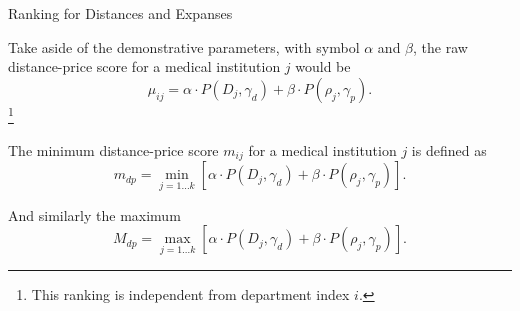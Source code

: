 \documentclass[8pt, hyperref={colorlinks=true}]{beamer}
\begin{document}
\begin{frame}{Ranking for Distances and Expanses}
\begin{definition}
Take aside of the demonstrative parameters, with symbol $\alpha$ and $\beta$, the raw distance-price score for a medical institution $j$ would be
\[
\mu_{ij}=\alpha \cdot P\left(D_j, \gamma_d\right) + \beta \cdot P\left(\rho_j, \gamma_p\right).
\]\footnote{This ranking is independent from department index $i$.}

The minimum distance-price score $m_{ij}$ for a medical institution $j$ is defined as
\[
m_{dp}=\min_{j = 1\dots k} \left[\alpha \cdot P\left(D_j, \gamma_d\right) + \beta \cdot P\left(\rho_j, \gamma_p\right)\right].
\]

And similarly the maximum
\[
M_{dp}=\max_{j = 1\dots k} \left[\alpha \cdot P\left(D_j, \gamma_d\right) + \beta \cdot P\left(\rho_j, \gamma_p\right)\right].
\]
\end{definition}
\end{frame}
\end{document}
